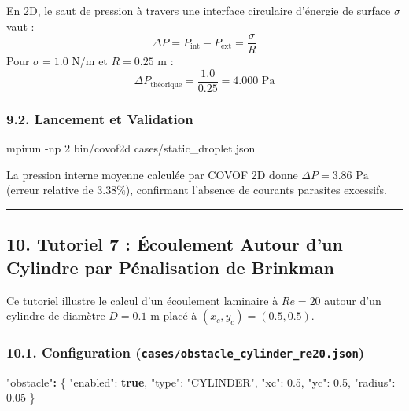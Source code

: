 \documentclass[
  french,
]{article}
\newenvironment{Shaded}{}{}
\newcommand{\AttributeTok}[1]{\textcolor[rgb]{0.49,0.56,0.16}{#1}}
\newcommand{\DataTypeTok}[1]{\textcolor[rgb]{0.56,0.13,0.00}{#1}}
\newcommand{\ErrorTok}[1]{\textcolor[rgb]{1.00,0.00,0.00}{\textbf{#1}}}
\newcommand{\ExtensionTok}[1]{#1}
\newcommand{\FloatTok}[1]{\textcolor[rgb]{0.25,0.63,0.44}{#1}}
\newcommand{\FunctionTok}[1]{\textcolor[rgb]{0.02,0.16,0.49}{#1}}
\newcommand{\KeywordTok}[1]{\textcolor[rgb]{0.00,0.44,0.13}{\textbf{#1}}}
\newcommand{\NormalTok}[1]{#1}
\newcommand{\StringTok}[1]{\textcolor[rgb]{0.25,0.44,0.63}{#1}}
\begin{document}
En 2D, le saut de pression à travers une interface circulaire d'énergie
de surface \(\sigma\) vaut :
\[\Delta P = P_{\text{int}} - P_{\text{ext}} = \frac{\sigma}{R}\] Pour
\(\sigma = 1.0\text{ N/m}\) et \(R = 0.25\text{ m}\) :
\[\Delta P_{\text{théorique}} = \frac{1.0}{0.25} = 4.000\text{ Pa}\]

\subsubsection{9.2. Lancement et
Validation}\label{lancement-et-validation}

\begin{Shaded}
\begin{Highlighting}[]
\ExtensionTok{mpirun} \AttributeTok{{-}np}\NormalTok{ 2 bin/covof2d cases/static\_droplet.json}
\end{Highlighting}
\end{Shaded}

La pression interne moyenne calculée par COVOF 2D donne
\(\Delta P = 3.86\text{ Pa}\) (erreur relative de \(3.38\%\)),
confirmant l'absence de courants parasites excessifs.

\begin{center}\rule{0.5\linewidth}{0.5pt}\end{center}

\subsection{10. Tutoriel 7 : Écoulement Autour d'un Cylindre par
Pénalisation de
Brinkman}\label{tutoriel-7-uxe9coulement-autour-dun-cylindre-par-puxe9nalisation-de-brinkman}

Ce tutoriel illustre le calcul d'un écoulement laminaire à \(Re=20\)
autour d'un cylindre de diamètre \(D=0.1\text{ m}\) placé à
\((x_c, y_c) = (0.5, 0.5)\).

\subsubsection{\texorpdfstring{10.1. Configuration
(\texttt{cases/obstacle\_cylinder\_re20.json})}{10.1. Configuration (cases/obstacle\_cylinder\_re20.json)}}\label{configuration-casesobstacle_cylinder_re20.json}

\begin{Shaded}
\begin{Highlighting}[]
\StringTok{"obstacle"}\ErrorTok{:} \FunctionTok{\{}
  \DataTypeTok{"enabled"}\FunctionTok{:} \KeywordTok{true}\FunctionTok{,}
  \DataTypeTok{"type"}\FunctionTok{:} \StringTok{"CYLINDER"}\FunctionTok{,}
  \DataTypeTok{"xc"}\FunctionTok{:} \FloatTok{0.5}\FunctionTok{,} \DataTypeTok{"yc"}\FunctionTok{:} \FloatTok{0.5}\FunctionTok{,}
  \DataTypeTok{"radius"}\FunctionTok{:} \FloatTok{0.05}
\FunctionTok{\}}
\end{Highlighting}
\end{Shaded}
\end{document}

